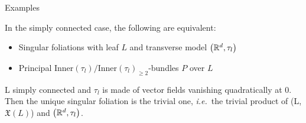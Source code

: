 \documentclass[
aspectratio=3218, 
10pt
]{beamer}
\theoremstyle{plain}
\theoremstyle{remark}
\begin{document}
\begin{frame}{Examples}
\begin{theorem}[{[C.\ L.-G., S.-R.\ F.]}]\vspace{.5pt}
In the simply connected case, the following are equivalent:
\begin{itemize}
	\item Singular foliations with leaf $L$ and transverse model $\mleft(\mathbb{R}^d, \tau_l\mright)$
	\item Principal $\mathrm{Inner}(\tau_l)/\mathrm{Inner}(\tau_l)_{\geq 2}$-bundles $P$ over $L$
\end{itemize}
\end{theorem}

\begin{corollary}\vspace{.5pt}
L simply connected and $\tau_l$ is made of vector fields vanishing quadratically at 0. Then the unique singular foliation is the trivial one, \textit{i.e.}\ the trivial product of (L, $\mathfrak{X}(L)$) and $\mleft(\mathbb{R}^d, \tau_l \mright)$.
\end{corollary}
\end{frame}

\end{document}
